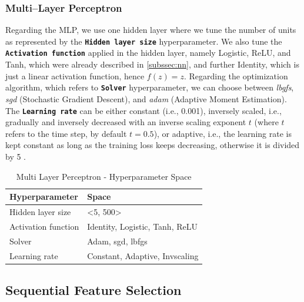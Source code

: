 \subsubsection{Multi--Layer Perceptron}
Regarding the MLP, we use one hidden layer where we tune the number of units as represented by the \textbf{\texttt{Hidden layer size}} hyperparameter.
We also tune the \textbf{\texttt{Activation function}} applied in the hidden layer, namely Logistic, ReLU, and Tanh, which were already described in \autoref{subssec:nn}, and further Identity, which is just a linear activation function, hence $f(z) = z$.
Regarding the optimization algorithm, which refers to \textbf{\texttt{Solver}} hyperparameter, we can choose between \textit{lbgfs}, \textit{sgd} (Stochastic Gradient Descent), and \textit{adam} (Adaptive Moment Estimation).
The \textbf{\texttt{Learning rate}} can be either constant (i.e., 0.001), inversely scaled, i.e., gradually and inversely decreased with an inverse scaling exponent $t$ (where $t$ refers to the time step, by default $t=0.5$), or adaptive, i.e., the learning rate is kept constant as long as the training loss keeps decreasing, otherwise it is divided by 5 \citep{scikit-mlp}.

\begin{table}[H]
\small
\setlength{\tabcolsep}{8pt}
\renewcommand{\arraystretch}{1.3}
\centering
    \caption[Multi Layer Perceptron - Hyperparameter Space]{Multi Layer Perceptron - Hyperparameter Space}\label{tab:mlpspace}
    \begin{tabular}{ll}
\toprule
\textbf{Hyperparameter} & \textbf{Space}\\
\midrule
\hline
Hidden layer size & <5, 500> \\
Activation function & Identity, Logistic, Tanh, ReLU \\
Solver & Adam, sgd, lbfgs \\
Learning rate & Constant, Adaptive, Invscaling \\
\hline
\bottomrule
\end{tabular}
\vspace{0.7em}

\vspace{-1em}
\end{table}

\newpage
\subsection{Sequential Feature Selection}
\label{subsec:feature-selection}

